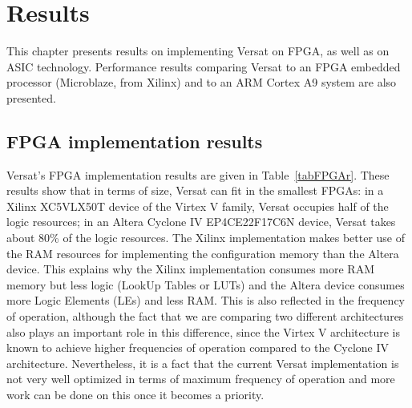 
\chapter{Results}
\label{chapter:results}

This chapter presents results on implementing Versat on FPGA, as well
as on ASIC technology. Performance results comparing Versat to an FPGA
embedded processor (Microblaze, from Xilinx) and to an ARM Cortex A9
system are also presented.


\section{FPGA implementation results}
\label{subsection:FPGAresults}

Versat's FPGA implementation results are given in
Table~\ref{tabFPGAr}. These results show that in terms of size, Versat
can fit in the smallest FPGAs: in a Xilinx XC5VLX50T device of the
Virtex V family, Versat occupies half of the logic resources; in an
Altera Cyclone IV EP4CE22F17C6N device, Versat takes about 80\% of the
logic resources. The Xilinx implementation makes better use of the RAM
resources for implementing the configuration memory than the Altera
device. This explains why the Xilinx implementation consumes more RAM
memory but less logic (LookUp Tables or LUTs) and the Altera device
consumes more Logic Elements (LEs) and less RAM. This is also
reflected in the frequency of operation, although the fact that we are
comparing two different architectures also plays an important role in
this difference, since the Virtex V architecture is known to achieve
higher frequencies of operation compared to the Cyclone IV
architecture.  Nevertheless, it is a fact that the current Versat
implementation is not very well optimized in terms of maximum
frequency of operation and more work can be done on this once it
becomes a priority.


